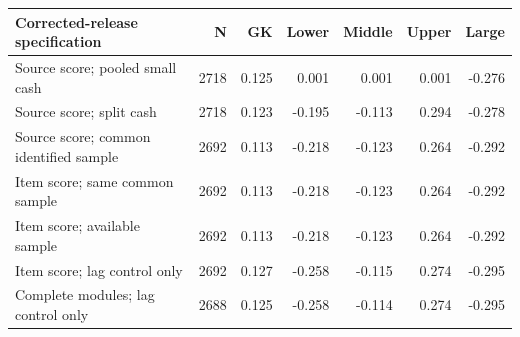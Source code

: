 \begin{tabular}{lrrrrrr}
\toprule
Corrected-release specification & N & GK & Lower & Middle & Upper & Large\\
\midrule
Source score; pooled small cash & 2718 & 0.125 & 0.001 & 0.001 & 0.001 & -0.276\\
Source score; split cash & 2718 & 0.123 & -0.195 & -0.113 & 0.294 & -0.278\\
Source score; common identified sample & 2692 & 0.113 & -0.218 & -0.123 & 0.264 & -0.292\\
Item score; same common sample & 2692 & 0.113 & -0.218 & -0.123 & 0.264 & -0.292\\
Item score; available sample & 2692 & 0.113 & -0.218 & -0.123 & 0.264 & -0.292\\
Item score; lag control only & 2692 & 0.127 & -0.258 & -0.115 & 0.274 & -0.295\\
Complete modules; lag control only & 2688 & 0.125 & -0.258 & -0.114 & 0.274 & -0.295\\
\bottomrule
\end{tabular}
